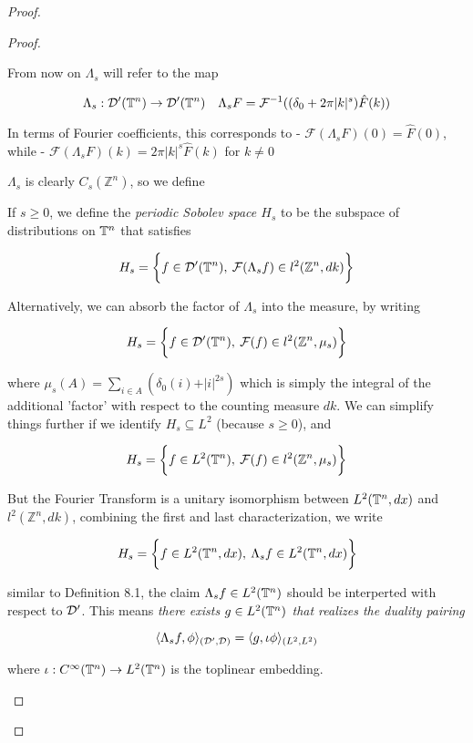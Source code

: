 \documentclass[../main-manifolds.tex]{subfiles}
\begin{document}
{{\begin{proof}
{{\begin{proof}
\begin{definition}
From now on $\Lambda_s$ will refer to the map

$$
\Lambda_s: \mathcal{D}'({\mathbb{T}^n})\to\mathcal{D}'({\mathbb{T}^n})\quad\Lambda_s F = \mathcal{F}^{-1}( (\delta_0 + 2\pi \vert k\vert^{s})\hat{F}(k))
$$

In terms of Fourier coefficients, this corresponds to 
- $\mathcal{F}(\Lambda_s F)(0) = \hat{F}(0)$, while 
- $\mathcal{F}(\Lambda_s F)(k) = 2\pi\vert k\vert^{s}\hat{F}(k)$ for $k\neq 0$

\end{definition}

$\Lambda_s$ is clearly $C_s(\mathbb{Z}^n)$, so we define
\begin{definition}
If $s\geq 0$, we define the \emph{periodic Sobolev space $H_s$} to be the subspace of distributions on ${\mathbb{T}^n}$ that satisfies 

$$
H_s = \biggl\{{f\in \mathcal{D}'({\mathbb{T}^n}),\: \mathcal{F}(\Lambda_s f)\in l^2(\mathbb{Z}^n,dk)}\biggr\}
$$

Alternatively, we can absorb the factor of $\Lambda_s$ into the measure, by writing 

$$
H_s = \biggl\{{f\in\mathcal{D}'({\mathbb{T}^n}),\: \mathcal{F}(f)\in l^2(\mathbb{Z}^n,\mu_s)}\biggr\}
$$

where $\mu_s(A) = \sum_{i\in A}(\delta_0(i) + \vert i\vert^{2s})$ which is simply the integral of the additional 'factor' with respect to the counting measure $dk$. We can simplify things further if we identify $H_s\subseteq L^2$ (because $s\geq 0$), and

$$
H_s = \biggl\{{f\in L^2({\mathbb{T}^n}),\: \mathcal{F}(f)\in l^2(\mathbb{Z}^n, \mu_s)}\biggr\}
$$

But the Fourier Transform is a unitary isomorphism between $L^2({\mathbb{T}^n},dx)$ and $l^2(\mathbb{Z}^n,dk)$, combining the first and last characterization, we write

$$
H_s = \biggl\{{f\in L^2({\mathbb{T}^n},dx),\: \Lambda_sf\in L^2({\mathbb{T}^n},dx)}\biggr\}
$$

similar to Definition 8.1, the claim $\Lambda_s f\in L^2({\mathbb{T}^n})$ should be interperted with respect to $\mathcal{D}'$. This means \emph{there exists $g\in L^2({\mathbb{T}^n})$ that realizes the duality pairing}

$$
\langle \Lambda_s f,\phi\rangle_{(\mathcal{D}',\mathcal{D})}=\langle g,\iota\phi\rangle_{(L^2,L^2)}
$$

where $\iota:C^\infty({\mathbb{T}^n})\to L^2({\mathbb{T}^n})$ is the toplinear embedding.

\end{definition}


\end{proof}}}
\end{proof}}}
\end{document}

